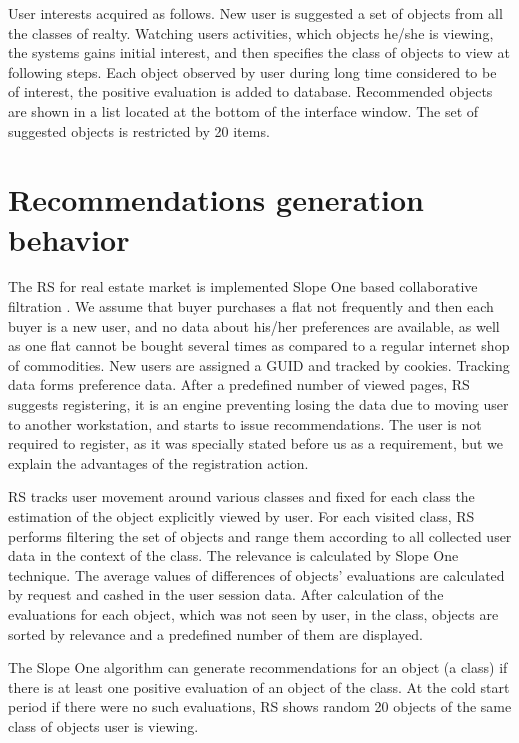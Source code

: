 \documentclass[conference]{IEEEtran}
\begin{document}
User interests acquired as follows.  New user is suggested a set of objects from all the classes of realty.  Watching users activities, which objects he/she is viewing, the systems gains initial interest, and then specifies the class of objects to view at following steps.  Each object observed by user during long time considered to be of interest, the positive evaluation is added to database.  Recommended objects are shown in a list located at the bottom of the interface window.  The set of suggested objects is restricted by 20 items.

\section{Recommendations generation behavior}
\label{sec:proc-recs}

The RS for real estate market is implemented Slope One based collaborative filtration \cite{br1}.  We assume that buyer purchases a flat not frequently and then each buyer is a new user, and no data about his/her preferences are available, as well as one flat cannot be bought several times as compared to a regular internet shop of commodities.  New users are assigned a GUID and tracked by cookies.  Tracking data forms preference data.  After a predefined number of viewed pages, RS suggests registering, it is an engine preventing losing the data due to moving user to another workstation, and starts to issue recommendations.  The user is not required to register, as it was specially stated before us as a requirement, but we explain the advantages of the registration action.

RS tracks user movement around various classes and fixed for each class the estimation of the object explicitly viewed by user. For each visited class, RS performs filtering the set of objects and range them according to all collected user data in the context of the class.  The relevance is calculated by Slope One technique.  The average values of differences of objects' evaluations are calculated by request and cashed in the user session data. After calculation of the evaluations for each object, which was not seen by user, in the class, objects are sorted by relevance and a predefined number of them are displayed.

The Slope One algorithm can generate recommendations for an object (a class) if there is at least one positive evaluation of an object of the class.  At the cold start period if there were no such evaluations, RS shows random 20 objects of the same class of objects user is viewing.
\end{document}
